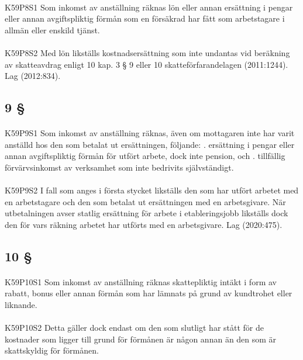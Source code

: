 \documentclass[a4paper,notitlepage,openany,10pt]{book}
\begin{document}
\paragraph*{}
{\tiny K59P8S1}
Som inkomst av anställning räknas lön eller annan ersättning i pengar eller annan avgiftspliktig förmån som en försäkrad har fått som arbetstagare i allmän eller enskild tjänst.
\paragraph*{}
{\tiny K59P8S2}
Med lön likställs kostnadsersättning som inte undantas vid beräkning av skatteavdrag enligt 10 kap. 3 § 9 eller 10 skatteförfarandelagen (2011:1244).
Lag (2012:834).
\subsection*{9 §}
\paragraph*{}
{\tiny K59P9S1}
Som inkomst av anställning räknas, även om mottagaren inte har varit anställd hos den som betalat ut ersättningen, följande:
. ersättning i pengar eller annan avgiftspliktig förmån för utfört arbete, dock inte pension, och
. tillfällig förvärvsinkomst av verksamhet som inte bedrivits självständigt.
\paragraph*{}
{\tiny K59P9S2}
I fall som anges i första stycket likställs den som har utfört arbetet med en arbetstagare och den som betalat ut ersättningen med en arbetsgivare. När utbetalningen avser statlig ersättning för arbete i etableringsjobb likställs dock den för vars räkning arbetet har utförts med en arbetsgivare.
Lag (2020:475).
\subsection*{10 §}
\paragraph*{}
{\tiny K59P10S1}
Som inkomst av anställning räknas skattepliktig intäkt i form av rabatt, bonus eller annan förmån som har lämnats på grund av kundtrohet eller liknande.
\paragraph*{}
{\tiny K59P10S2}
Detta gäller dock endast om den som slutligt har stått för de kostnader som ligger till grund för förmånen är någon annan än den som är skattskyldig för förmånen.
\end{document}
